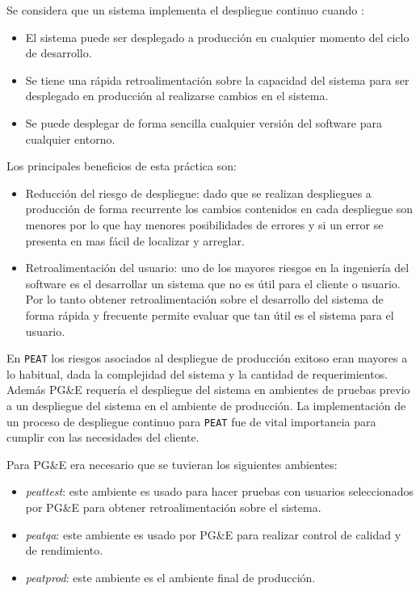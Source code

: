 \vspace{2.5mm}

Se considera que un sistema implementa el despliegue continuo cuando
\cite{27_martin_fowler_cd}:
\begin{itemize}
\item El sistema puede ser desplegado a producción en cualquier momento del
  ciclo de desarrollo.
\item Se tiene una rápida retroalimentación sobre la capacidad del sistema
  para ser desplegado en producción al realizarse cambios en el sistema.
\item Se puede desplegar de forma sencilla cualquier versión del software para
  cualquier entorno.
\end{itemize}

Los principales beneficios de esta práctica son:
\begin{itemize}
\item Reducción del riesgo de despliegue: dado que se realizan despliegues
  a producción de forma recurrente los cambios contenidos en cada despliegue
  son menores por lo que hay menores posibilidades de errores y si un error
  se presenta en mas fácil de localizar y arreglar.
\item Retroalimentación del usuario: uno de los mayores riesgos en la ingeniería
  del software es el desarrollar un sistema que no es útil para el cliente o usuario.
  Por lo tanto obtener retroalimentación sobre el desarrollo del sistema de forma
  rápida y frecuente permite evaluar que tan útil es el sistema para el usuario.
\end{itemize}

En \texttt{PEAT} los riesgos asociados al despliegue de producción exitoso
eran mayores a lo habitual, dada la complejidad del sistema y la cantidad
de requerimientos. Además PG\&E requería el despliegue del sistema en ambientes
de pruebas previo a un despliegue del sistema en el ambiente de producción.
La implementación de un proceso de despliegue continuo para \texttt{PEAT} fue de
vital importancia para cumplir con las necesidades del cliente.

\vspace{2.5mm}

Para PG\&E era necesario que se tuvieran los siguientes ambientes:
\begin{itemize}
\item \textit{peattest}: este ambiente es usado para hacer pruebas con usuarios
  seleccionados por PG\&E para obtener retroalimentación sobre el sistema.
\item \textit{peatqa}: este ambiente es usado por PG\&E para realizar control de
  calidad y de rendimiento.
\item \textit{peatprod}: este ambiente es el ambiente final de producción.
\end{itemize}

